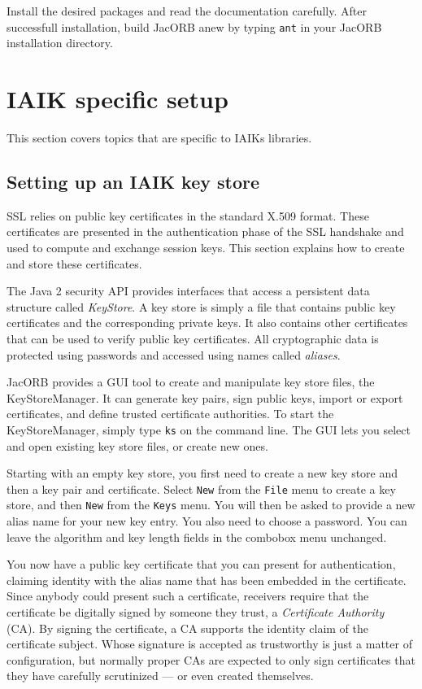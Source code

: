 \documentclass[12pt]{scrbook}
\begin{document}
Install the desired packages and read the documentation carefully. After
successfull installation, build JacORB anew by typing {\tt ant} in your JacORB
installation directory.


\section{IAIK specific setup}
This section covers topics that are specific to IAIKs libraries.

\subsection{Setting up an IAIK key store}

SSL  relies   on  public  key  certificates  in   the  standard  X.509
format. These  certificates are presented in  the authentication phase
of the  SSL handshake and used  to compute and  exchange session keys.
This section explains how to create and store these certificates.

The Java 2  security API provides interfaces that  access a persistent
data structure  called {\em  KeyStore}. A key  store is simply  a file
that contains  public key  certificates and the  corresponding private
keys. It also  contains other certificates that can  be used to verify
public key  certificates.  All  cryptographic data is  protected using
passwords and accessed using names called {\em aliases}.

JacORB provides a  GUI tool to create and  manipulate key store files,
the  KeyStoreManager. It  can generate  key pairs,  sign  public keys,
import  or   export  certificates,  and   define  trusted  certificate
authorities. To start the KeyStoreManager, simply type {\tt ks} on the
command  line. The GUI  lets you  select and  open existing  key store
files, or create new ones.

Starting with an  empty key store, you first need to  create a new key
store and then  a key pair and certificate. Select  {\tt New} from the
{\tt File}  menu to create  a key store,  and then {\tt New}  from the
{\tt Keys} menu.   You will then be asked to provide  a new alias name
for your  new key entry. You also  need to choose a  password. You can
leave  the  algorithm  and  key  length fields  in  the  combobox  menu
unchanged.

\bigskip
\centerline{}

You  now  have a  public  key certificate  that  you  can present  for
authentication, claiming  identity with the  alias name that  has been
embedded  in the  certificate.   Since anybody  could  present such  a
certificate,  receivers  require  that  the certificate  be  digitally
signed by someone  they trust, a {\em Certificate  Authority} (CA). By
signing  the certificate,  a CA  supports  the identity  claim of  the
certificate  subject. Whose  signature is  accepted as  trustworthy is
just a matter  of configuration, but normally proper  CAs are expected
to only sign certificates that  they have carefully scrutinized --- or
even created themselves. 
\end{document}
